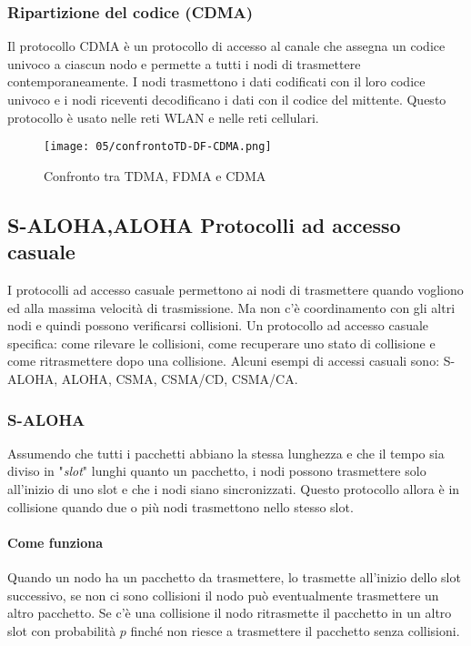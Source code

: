         \subsubsection{Ripartizione del codice (\Acrshort*{CDMA})}
            Il protocollo \Acrshort*{CDMA} è un protocollo di accesso al canale che assegna un codice univoco a ciascun nodo e permette a tutti i nodi di trasmettere contemporaneamente. I nodi trasmettono i dati codificati con il loro codice univoco e i nodi riceventi decodificano i dati con il codice del mittente. Questo protocollo è usato nelle reti \Acrshort*{WLAN} e nelle reti cellulari.
        \begin{figure}[H]
            \centering
            \texttt{[image: 05/confrontoTD-DF-CDMA.png]}
            \caption{Confronto tra \Acrshort*{TDMA}, \Acrshort*{FDMA} e \Acrshort*{CDMA}}
        \end{figure}
    \subsection[\textit{Slotted ALOHA},\textit{ALOHA} Protocolli ad accesso casuale]{\Acrlong*{S-ALOHA},\Acrlong*{ALOHA} Protocolli ad accesso casuale}
            I protocolli ad accesso casuale permettono ai nodi di trasmettere quando vogliono ed alla massima velocità di trasmissione. Ma non c'è coordinamento con gli altri nodi e quindi possono verificarsi collisioni.\newline
            Un protocollo ad accesso casuale specifica: come rilevare le collisioni, come recuperare uno stato di collisione e come ritrasmettere dopo una collisione.\newline
            Alcuni esempi di accessi casuali sono: \acrfull*{S-ALOHA}, \acrfull*{ALOHA},
            \Acrshort*{CSMA}, \Acrshort*{CSMA/CD}, \Acrshort*{CSMA/CA}.
        \subsubsection{\Acrlong*{S-ALOHA}}
            Assumendo che tutti i pacchetti abbiano la stessa lunghezza e che il tempo sia diviso in "\textit{slot}" lunghi quanto un pacchetto, i nodi possono trasmettere solo all'inizio di uno slot e che i nodi siano sincronizzati. Questo protocollo allora è in collisione quando due o più nodi trasmettono nello stesso slot.
            \paragraph{Come funziona} Quando un nodo ha un pacchetto da trasmettere, lo trasmette all'inizio dello slot successivo, se non ci sono collisioni il nodo può eventualmente trasmettere un altro pacchetto. Se c'è una collisione il nodo ritrasmette il pacchetto in un altro slot con probabilità $p$ finché non riesce a trasmettere il pacchetto senza collisioni.
